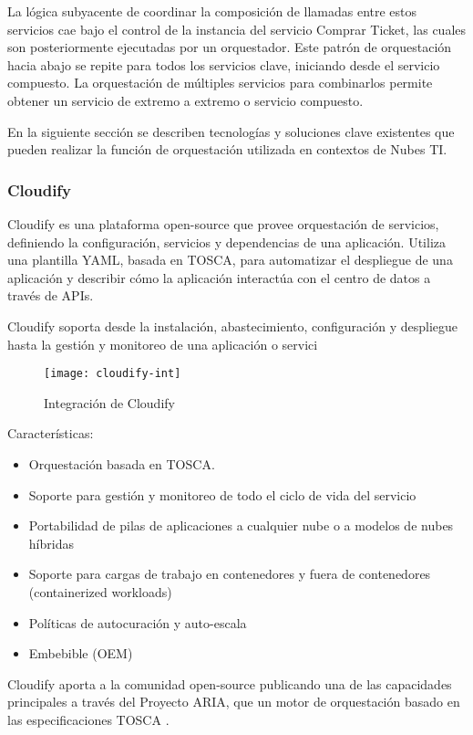         La lógica subyacente de coordinar la composición de llamadas entre estos servicios cae bajo el control de la instancia del servicio Comprar Ticket, las cuales son posteriormente ejecutadas por un orquestador.  Este patrón de orquestación hacia abajo se repite para todos los servicios clave, iniciando desde el servicio compuesto. La orquestación de múltiples servicios para combinarlos permite obtener un servicio de extremo a extremo o servicio compuesto. 
        
        En la siguiente sección se describen tecnologías y soluciones clave existentes que pueden realizar la función de orquestación utilizada en contextos de Nubes TI.
	    
	    \subsubsection{Cloudify}
        Cloudify \cite{Cloudify2016-qi} es una plataforma open-source que provee orquestación de servicios, definiendo la configuración, servicios y dependencias de una aplicación. Utiliza una plantilla YAML, basada en TOSCA, para automatizar el despliegue de una aplicación y describir cómo la aplicación interactúa con el centro de datos a través de APIs.
        
        Cloudify soporta desde la instalación, abastecimiento, configuración y despliegue hasta la gestión y monitoreo de una aplicación o servici
    	    
\begin{figure}[H]
    \centering
    \texttt{[image: cloudify-int]}
    \caption{Integración de Cloudify \protect\cite{Cloudify2016-je}}
    \label{fig:cloudify-int}
\end{figure}
    
Características:
\begin{itemize}
\item Orquestación basada en TOSCA.
\item Soporte para gestión y monitoreo de todo el ciclo de vida del servicio
\item Portabilidad de pilas de aplicaciones a cualquier nube o a modelos de nubes híbridas
\item Soporte para cargas de trabajo en contenedores y fuera de contenedores (containerized workloads)
\item Políticas de autocuración y auto-escala
\item Embebible (OEM)
\end{itemize}
Cloudify aporta a la comunidad open-source publicando una de las capacidades principales a través del Proyecto ARIA, que un motor de orquestación basado en las especificaciones TOSCA 
\cite{Oasis2016-sk}.

